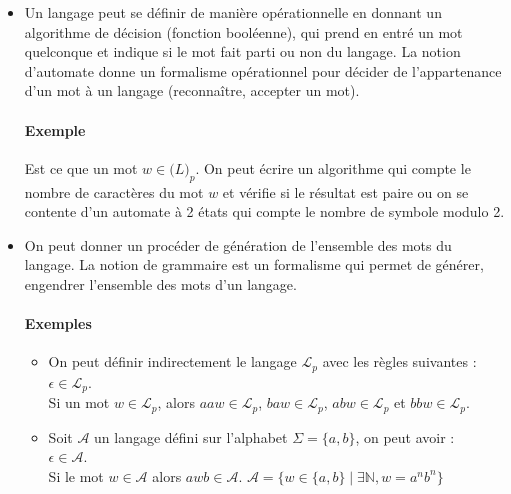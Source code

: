 \begin{itemize}
	\item Un langage peut se définir de manière opérationnelle en donnant un algorithme de décision (fonction booléenne), qui prend en entré un mot quelconque et indique si le mot fait parti ou non du langage. La notion d'automate donne un formalisme opérationnel pour décider de l'appartenance d'un mot à un langage (reconnaître, accepter un mot).

	\paragraph{Exemple} %
	\label{par:exemple}

	Est ce que un mot $w \in \mathcal(L)_p$. On peut écrire un algorithme qui compte le nombre de caractères du mot $w$ et vérifie si le résultat est paire ou on se contente d'un automate à 2 états qui compte le nombre de symbole modulo 2.\\
	


	\item On peut donner un procéder de génération de l'ensemble des mots du langage. La notion de grammaire est un formalisme qui permet de générer, engendrer l'ensemble des mots d'un langage.\\

	\paragraph{Exemples} %
	\label{par:exemples}

	\begin{itemize}
		\item On peut définir indirectement le langage $\mathcal{L}_p$ avec les règles suivantes :\\
		$\epsilon \in \mathcal{L}_p$.\\
		Si un mot $w \in \mathcal{L}_p$, alors $aaw \in \mathcal{L}_p$, $baw \in \mathcal{L}_p$, $abw \in \mathcal{L}_p$ et $bbw \in \mathcal{L}_p$.

		\item Soit $\mathcal{A}$ un langage défini sur l'alphabet $\Sigma = \{a,b\}$, on peut avoir :\\
		$\epsilon \in \mathcal{A}$.\\
		Si le mot $w \in \mathcal{A}$ alors $awb \in \mathcal{A}$.
		$\mathcal{A} = \{w \in \{a,b\} \mid \exists \mathbb{N}, w=a^nb^n\}$
	\end{itemize}



\end{itemize}

